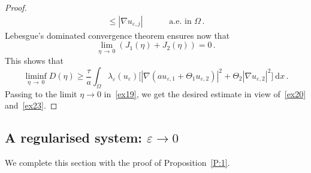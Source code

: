 \documentclass[AHL,Unicode,longabstracts,published]{cedram}
\newcommand{\rmd}{\mathrm{d}}
\begin{document}
\begin{proof}
\begin{align*}
\leq |\nabla u_{\varepsilon,j}|\qquad &\text{ a.e. in $\Omega$}\,.
\end{align*}
Lebesgue's dominated convergence theorem ensures now that
\begin{equation*}
\lim_{\eta\,\to\,0} \left(J_1(\eta) + J_2(\eta) \right) = 0\,.
\end{equation*}
This shows that
\begin{equation}
\liminf_{\eta\,\to\,0} D(\eta) \ge \frac{\tau}{a} \int_\Omega\lambda_\varepsilon(u_{\varepsilon}) \big[\left|\nabla \left(a u_{\varepsilon,1}+\Theta_1 u_{\varepsilon,2}\right)\right|^2 + \Theta_2\left|\nabla u_{\varepsilon,2}\right|^2 \big]\ \rmd x\,. \label{ex23}
\end{equation}
Passing to the limit $\eta\to 0$ in~\eqref{ex19}, we get the desired estimate in view of~\eqref{ex20} and~\eqref{ex23}.
\end{proof}



\subsection{A regularised system: \texorpdfstring{$\varepsilon\to 0$}{varepsilon to 0}}\label{sec2.4}



We complete this section with the proof of Proposition~\ref{P:1}.
\end{document}
